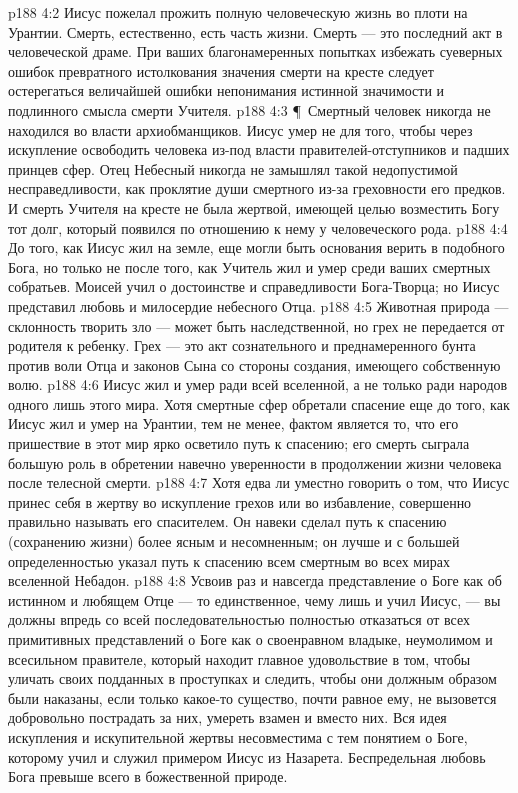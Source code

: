 \vs p188 4:2 Иисус пожелал прожить полную человеческую жизнь во плоти на Урантии. Смерть, естественно, есть часть жизни. Смерть --- это последний акт в человеческой драме. При ваших благонамеренных попытках избежать суеверных ошибок превратного истолкования значения смерти на кресте следует остерегаться величайшей ошибки непонимания истинной значимости и подлинного смысла смерти Учителя.
\vs p188 4:3 \P\ Смертный человек никогда не находился во власти архиобманщиков. Иисус умер не для того, чтобы через искупление освободить человека из\hyp{}под власти правителей\hyp{}отступников и падших принцев сфер. Отец Небесный никогда не замышлял такой недопустимой несправедливости, как проклятие души смертного из\hyp{}за греховности его предков. И смерть Учителя на кресте не была жертвой, имеющей целью возместить Богу тот долг, который появился по отношению к нему у человеческого рода.
\vs p188 4:4 До того, как Иисус жил на земле, еще могли быть основания верить в подобного Бога, но только не после того, как Учитель жил и умер среди ваших смертных собратьев. Моисей учил о достоинстве и справедливости Бога\hyp{}Творца; но Иисус представил любовь и милосердие небесного Отца.
\vs p188 4:5 Животная природа --- склонность творить зло --- может быть наследственной, но грех не передается от родителя к ребенку. Грех --- это акт сознательного и преднамеренного бунта против воли Отца и законов Сына со стороны создания, имеющего собственную волю.
\vs p188 4:6 Иисус жил и умер ради всей вселенной, а не только ради народов одного лишь этого мира. Хотя смертные сфер обретали спасение еще до того, как Иисус жил и умер на Урантии, тем не менее, фактом является то, что его пришествие в этот мир ярко осветило путь к спасению; его смерть сыграла большую роль в обретении навечно уверенности в продолжении жизни человека после телесной смерти.
\vs p188 4:7 Хотя едва ли уместно говорить о том, что Иисус принес себя в жертву во искупление грехов или во избавление, совершенно правильно называть его спасителем. Он навеки сделал путь к спасению (сохранению жизни) более ясным и несомненным; он лучше и с большей определенностью указал путь к спасению всем смертным во всех мирах вселенной Небадон.
\vs p188 4:8 Усвоив раз и навсегда представление о Боге как об истинном и любящем Отце --- то единственное, чему лишь и учил Иисус, --- вы должны впредь со всей последовательностью полностью отказаться от всех примитивных представлений о Боге как о своенравном владыке, неумолимом и всесильном правителе, который находит главное удовольствие в том, чтобы уличать своих подданных в проступках и следить, чтобы они должным образом были наказаны, если только какое\hyp{}то существо, почти равное ему, не вызовется добровольно пострадать за них, умереть взамен и вместо них. Вся идея искупления и искупительной жертвы несовместима с тем понятием о Боге, которому учил и служил примером Иисус из Назарета. Беспредельная любовь Бога превыше всего в божественной природе.
